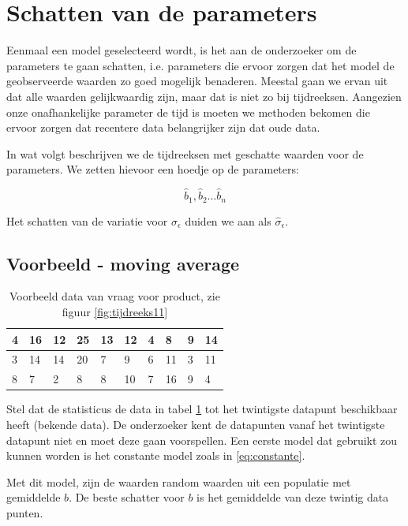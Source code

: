 \section{Schatten van de parameters}
Eenmaal een model geselecteerd wordt, is het aan de onderzoeker om de parameters te gaan schatten, i.e. parameters die ervoor zorgen dat het model de geobserveerde waarden zo goed mogelijk benaderen. Meestal gaan we ervan uit dat alle waarden gelijkwaardig zijn, maar dat is niet zo bij tijdreeksen. Aangezien onze onafhankelijke parameter de tijd is moeten we methoden bekomen die ervoor zorgen dat recentere data belangrijker zijn dat oude data. 

In wat volgt beschrijven we de tijdreeksen met geschatte waarden voor de parameters. We zetten hievoor een hoedje op de parameters:

\[ \widehat{b}_{1}, \widehat{b}_{2} \dots \widehat{b}_{n} \] 

Het schatten van de variatie voor $\sigma_{\epsilon}$ duiden we aan als $\widehat{\sigma}_{\epsilon}$.

\subsection{Voorbeeld - moving average}

\begin{table}[t]
\centering
    \begin{tabular}{|l|l|l|l|l|l|l|l|l|l|}
    \hline
    4 & 16 & 12 & 25 & 13 & 12 & 4 & 8  & 9 & 14 \\ \hline
    3 & 14 & 14 & 20 & 7  & 9  & 6 & 11 & 3 & 11 \\ \hline
    8 & 7  & 2  & 8  & 8  & 10 & 7 & 16 & 9 & 4  \\ \hline
    \end{tabular}
		\label{tab:data}
		\caption{Voorbeeld data van vraag voor product, zie figuur \ref{fig:tijdreeks11}}
\end{table}

Stel dat de statisticus de data in tabel \ref{tab:data} tot het twintigste datapunt beschikbaar heeft (bekende data). De onderzoeker kent de datapunten vanaf het twintigste datapunt niet en moet deze gaan voorspellen. Een eerste model dat gebruikt zou kunnen worden is het constante model zoals in \ref{eq:constante}. 

Met dit model, zijn de waarden random waarden uit een populatie met gemiddelde $b$. De beste schatter voor $b$ is het gemiddelde van deze twintig data punten. 

